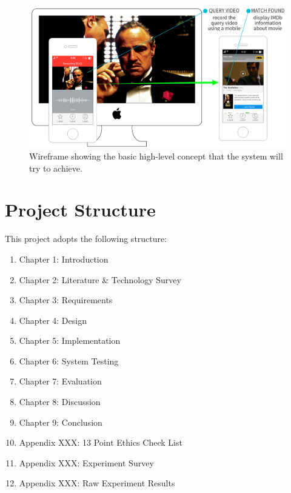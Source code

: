 \begin{figure}[h]
\centerline{\includegraphics[width=1.15\textwidth]{figures/introduction/system_wireframe.png}}
\caption{\label{fig:wireframe}Wireframe showing the basic high-level concept that the system will try to achieve.}
\end{figure}

\section{Project Structure}

This project adopts the following structure:

\begin{enumerate}
    \item Chapter 1: Introduction
    \item Chapter 2: Literature \& Technology Survey
    \item Chapter 3: Requirements
    \item Chapter 4: Design
    \item Chapter 5: Implementation
    \item Chapter 6: System Testing
    \item Chapter 7: Evaluation
    \item Chapter 8: Discussion
    \item Chapter 9: Conclusion
    \item Appendix XXX: 13 Point Ethics Check List
    \item Appendix XXX: Experiment Survey
    \item Appendix XXX: Raw Experiment Results
\end{enumerate}
